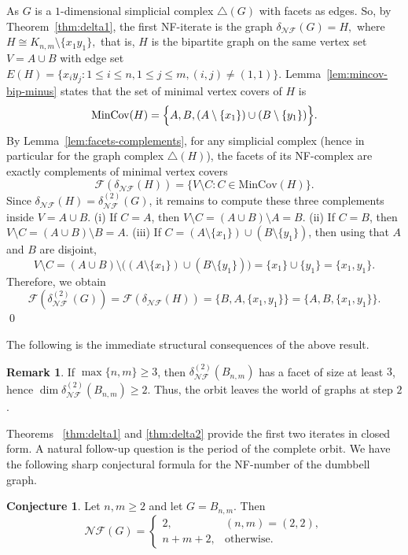 \documentclass[12pt]{article}
\renewenvironment{proof}{{\noindent\bfseries Proof.}}{\qed}
\theoremstyle{plain}
\theoremstyle{definition}
\newtheorem{remark}[theorem]{Remark}
\newtheorem{conjecture}[theorem]{Conjecture}
\newcommand{\F}{\mathcal{F}}
\newcommand{\MIN}{\mathrm{MinCov}}
\newcommand{\V}{V}
\newcommand{\A}{A}
\newcommand{\B}{B}
\begin{document}
	\begin{proof}
		As $G$  is a $1$-dimensional simplicial complex $\bigtriangleup(G)$ with facets as edges. So, by Theorem~\ref{thm:delta1}, the first NF-iterate is the graph $\delta_{\mathcal{NF}}(G)=H,$ where $H \cong K_{n,m}\setminus\{x_1y_1\},$ that is, $H$ is the bipartite graph on the same vertex set $\V=\A\cup\B$ with edge set
		 $E(H)=\{x_i y_j: 1\le i\le n, 1\le j\le m, (i,j)\neq(1,1)\}.$ 
		Lemma~\ref{lem:mincov-bip-minus} states that the set of minimal vertex covers of $H$ is
		\[
		\MIN(H)=\Bigl\{ \A, \B, (\A\setminus\{x_1\})\cup(\B\setminus\{y_1\}) \Bigr\}.
		\]
		 By Lemma~\ref{lem:facets-complements}, for any simplicial complex (hence in particular for the graph complex $\bigtriangleup(H)$),
		the facets of its NF-complex are exactly complements of minimal vertex covers
		\[
		\F(\delta_{\mathcal{NF}}(H))=\{ \V\setminus C  : C\in\MIN(H) \}.
		\]
		Since $\delta_{\mathcal{NF}}(H)=\delta_{\mathcal{NF}}^{(2)}(G)$, it remains to compute these three complements inside $\V=\A\cup\B$. (i) If $C=\A$, then $\V\setminus C=(\A\cup\B)\setminus\A=\B$. (ii) If $C=\B$, then $\V\setminus C=(\A\cup\B)\setminus\B=\A$. (iii)   If $C=(\A\setminus\{x_1\})\cup(\B\setminus\{y_1\})$, then using that $\A$ and $\B$ are disjoint,
			\[
			\V\setminus C
			= (\A\cup\B)\setminus\bigl((\A\setminus\{x_1\})\cup(\B\setminus\{y_1\})\bigr)
			= \{x_1\}\cup\{y_1\}
			= \{x_1,y_1\}.
			\] 
		Therefore, we obtain
		\[
		\F\!\left(\delta_{\mathcal{NF}}^{(2)}(G)\right)
		=\F(\delta_{\mathcal{NF}}(H))
		=\{\B, \A, \{x_1,y_1\}\}
		=\{\A, \B, \{x_1,y_1\}\}.
		\]
	\end{proof}
	
	The following is the immediate structural consequences of the above result.
	\begin{remark}
		If $\max\{n,m\}\ge 3$, then $\delta_{\mathcal{NF}}^{(2)}(B_{n,m})$ has a facet of size at least $3$, hence $\dim \delta_{\mathcal{NF}}^{(2)}(B_{n,m})\ge 2$.
		Thus, the orbit leaves the world of graphs at step $2$.
	\end{remark}
	
	
	Theorems ~\ref{thm:delta1} and  \ref{thm:delta2} provide the first two iterates in closed form.
	A natural follow-up question is the period of the complete orbit.  We have the following sharp conjectural formula for the NF-number of the dumbbell graph.
	\begin{conjecture}\label{conj:nf-dumbbell}
		Let $n,m\ge 2$ and let $G=B_{n,m}$.
		Then
		\[
		\mathcal{NF}(G)=
		\begin{cases}
			2, & (n,m)=(2,2),\\
			n+m+2, & \text{otherwise}.
		\end{cases}
		\]
	\end{conjecture}
	
\end{document}
